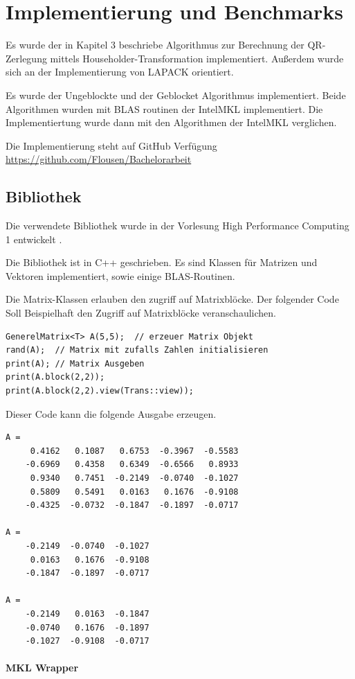 \chapter{Implementierung und Benchmarks}
Es wurde der in Kapitel 3 beschriebe Algorithmus zur Berechnung der QR-Zerlegung mittels Householder-Transformation implementiert. Außerdem wurde sich an der Implementierung von LAPACK orientiert.

Es wurde der Ungeblockte und der Geblocket Algorithmus implementiert. Beide Algorithmen wurden mit BLAS routinen der IntelMKL implementiert. Die Implementiertung wurde dann mit den Algorithmen der IntelMKL verglichen.

Die Implementierung steht auf GitHub Verfügung \cite{git} \url{https://github.com/Flousen/Bachelorarbeit}

\section{Bibliothek}
Die verwendete Bibliothek wurde in der Vorlesung High Performance Computing 1 entwickelt \cite{HPC1}.

Die Bibliothek ist in C++ geschrieben. Es sind Klassen für Matrizen und Vektoren implementiert, sowie einige BLAS-Routinen.

Die Matrix-Klassen erlauben den zugriff auf Matrixblöcke. 
Der folgender Code Soll Beispielhaft den Zugriff auf Matrixblöcke veranschaulichen.
\begin{lstlisting}
GenerelMatrix<T> A(5,5);  // erzeuer Matrix Objekt
rand(A);  // Matrix mit zufalls Zahlen initialisieren
print(A); // Matrix Ausgeben
print(A.block(2,2));
print(A.block(2,2).view(Trans::view));
\end{lstlisting}

Dieser Code kann die folgende Ausgabe erzeugen.
\lstset{numbers=none}
\begin{lstlisting} 
A = 
     0.4162   0.1087   0.6753  -0.3967  -0.5583
    -0.6969   0.4358   0.6349  -0.6566   0.8933
     0.9340   0.7451  -0.2149  -0.0740  -0.1027
     0.5809   0.5491   0.0163   0.1676  -0.9108
    -0.4325  -0.0732  -0.1847  -0.1897  -0.0717

A = 
    -0.2149  -0.0740  -0.1027
     0.0163   0.1676  -0.9108
    -0.1847  -0.1897  -0.0717

A = 
    -0.2149   0.0163  -0.1847
    -0.0740   0.1676  -0.1897
    -0.1027  -0.9108  -0.0717
\end{lstlisting}

\subsubsection{MKL Wrapper}




